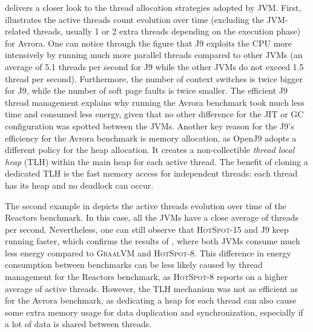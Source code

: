 delivers a closer look to the thread allocation strategies adopted by JVM.
First,  illustrates the active threads count evolution over time (excluding the JVM-related threads, usually 1 or 2 extra threads depending on the execution phase) for \textsf{Avrora}.
One can notice through the figure that \textsc{J9} exploits the CPU more intensively by running much more parallel threads compared to other JVMs (an average of 5.1 threads per second for \textsc{J9} while the other JVMs do not exceed 1.5 thread per second).
Furthermore, the number of context switches is twice bigger for \textsc{J9}, while the number of soft page faults is twice smaller.
The efficient \textsc{J9} thread management explains why running the \textsf{Avrora} benchmark took much less time and consumed less energy, given that no other difference for the JIT or GC configuration was spotted between the JVMs.
Another key reason for the \textsc{J9}'s efficiency for the \textsf{Avrora} benchmark is memory allocation, as \textsf{OpenJ9} adopts a different policy for the heap allocation.
It creates a non-collectible \emph{thread local heap} (TLH) within the main heap for each active thread.
The benefit of cloning a dedicated TLH is the fast memory access for independent threads: each thread has its heap and no deadlock can occur.

The second example in  depicts the active threads evolution over time of the \textsf{Reactors} benchmark.
In this case, all the JVMs have a close average of threads per second.
Nevertheless, one can still observe that \textsc{HotSpot-15} and \textsc{J9} keep running faster, which confirms the results of , where both JVMs consume much less energy compared to \textsc{GraalVM} and \textsc{HotSpot-8}.
This difference in energy consumption between benchmarks can be less likely caused by thread management for the \textsf{Reactors} benchmark, as \textsc{HotSpot-8} reports on a higher average of active threads.
However, the TLH mechanism was not as efficient as for the \textsf{Avrora} benchmark, as dedicating a heap for each thread can also cause some extra memory usage for data duplication and synchronization, especially if a lot of data is shared between threads.


